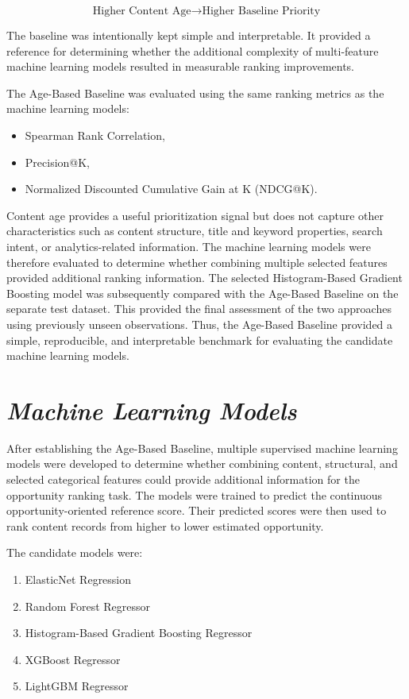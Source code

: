 \documentclass[12pt,a4paper]{report}
\begin{document}
\begin{equation}
\text{Higher Content Age}
\rightarrow
\text{Higher Baseline Priority}
\end{equation}

The baseline was intentionally kept simple and interpretable. It provided a reference for determining whether the additional complexity of multi-feature machine learning models resulted in measurable ranking improvements.

The Age-Based Baseline was evaluated using the same ranking metrics as the machine learning models:

\begin{itemize}
    \item Spearman Rank Correlation,
    \item Precision@K,
    \item Normalized Discounted Cumulative Gain at K (NDCG@K).
\end{itemize}

Content age provides a useful prioritization signal but does not capture other characteristics such as content structure, title and keyword properties, search intent, or analytics-related information. The machine learning models were therefore evaluated to determine whether combining multiple selected features provided additional ranking information. The selected Histogram-Based Gradient Boosting model was subsequently compared with the Age-Based Baseline on the separate test dataset. This provided the final assessment of the two approaches using previously unseen observations. Thus, the Age-Based Baseline provided a simple, reproducible, and interpretable benchmark for evaluating the candidate machine learning models.

\section{\textit{Machine Learning Models}}

After establishing the Age-Based Baseline, multiple supervised machine learning models were developed to determine whether combining content, structural, and selected categorical features could provide additional information for the opportunity ranking task. The models were trained to predict the continuous opportunity-oriented reference score. Their predicted scores were then used to rank content records from higher to lower estimated opportunity.

The candidate models were:

\begin{enumerate}
    \item ElasticNet Regression
    \item Random Forest Regressor
    \item Histogram-Based Gradient Boosting Regressor
    \item XGBoost Regressor
    \item LightGBM Regressor
\end{enumerate}
\end{document}
